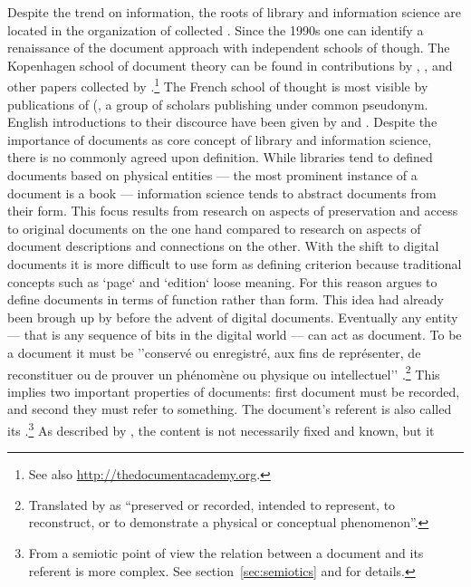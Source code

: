Despite the trend on information, the roots of library and information science
are located in the organization of collected . Since
the 1990s one can identify a renaissance of the document approach with
independent schools of though. The Kopenhagen school of document theory can be
found in contributions by \textcite{Lund2009}, \textcite{Hjorland2007},
\textcite{Orom2007} and other papers collected by
\textcite{Skare2007}.\footnote{See also \url{http://thedocumentacademy.org}.}
The French school of thought is most visible by publications of 
(\citeyear{Pedauque2003,Pedauque2006,Pedauque2007,Pedauque2011}, a
group of scholars publishing under common pseudonym. English introductions to
their discource have been given by \textcite{Truex2007} and
\textcite{Gradmann2008}.  Despite the importance of documents as core concept
of library and information science, there is no commonly agreed upon
definition. While libraries tend to defined documents based on physical
entities --- the most prominent instance of a document is a book ---
information science tends to abstract documents from their form. This focus
results from research on aspects of preservation and access to original
documents on the one hand compared to research on aspects of document
descriptions and connections on the other. With the shift to digital documents
it is more difficult to use form as defining criterion because traditional
concepts such as `page` and `edition` loose meaning. For this reason
\textcite{Buckland1997,Buckland1998} argues to define documents in terms of
function rather than form. This idea had already been brough up by
\textcite{Briet1951} before the advent of digital documents.  Eventually any
entity --- that is any sequence of bits in the digital world --- can act as
document. To be a document it must be ''conserv\'e ou enregistr\'e, aux fins de
repr\'esenter, de reconstituer ou de prouver un ph\'enom\`ene ou physique ou
intellectuel'' \cite[p. 7]{Briet1951}.\footnote{Translated by
\textcite{Buckland1997} as ``preserved or recorded, intended to represent, to
reconstruct, or to demonstrate a physical or conceptual phenomenon''.} This
implies two important properties of documents: first document must be recorded,
and second they must refer to something. The document's referent is also called
its .\footnote{From a semiotic point of view the relation between
a document and its referent is more complex. See section~\ref{sec:semiotics}
and \textcite{Brier2008,Brier2006} for details.} As described by
\textcite{Yeo2010}, the content is not necessarily fixed and known, but it

